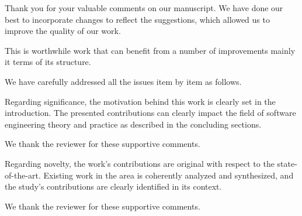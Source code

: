 \documentclass[12pt,english]{reviewresponse}
\begin{document}
\begin{concludingresponse}
	Thank you for your valuable comments on our manuscript. 
	We have done our best to incorporate changes to reflect the suggestions, which allowed us to improve the quality of our work.
\end{concludingresponse}


\reviewer
\begin{generalcomment}
This is worthwhile work that can benefit from a number of improvements mainly it terms of its structure.
\end{generalcomment}
\begin{revresponse}
	We have carefully addressed all the issues item by item as follows.
\end{revresponse}

\begin{revcomment}
Regarding significance, the motivation behind this work is clearly set in the introduction. The presented contributions can clearly impact the field of software engineering theory and practice as described in the concluding sections.
\end{revcomment}

\begin{revresponse}
We thank the reviewer for these supportive comments.
\end{revresponse}

\begin{revcomment}
Regarding novelty, the work's contributions are original with respect to the state-of-the-art. Existing work in the area is coherently analyzed and synthesized, and the study's contributions are clearly identified in its context.
\end{revcomment}
\begin{revresponse}
We thank the reviewer for these supportive comments.
\end{revresponse}
\end{document}
